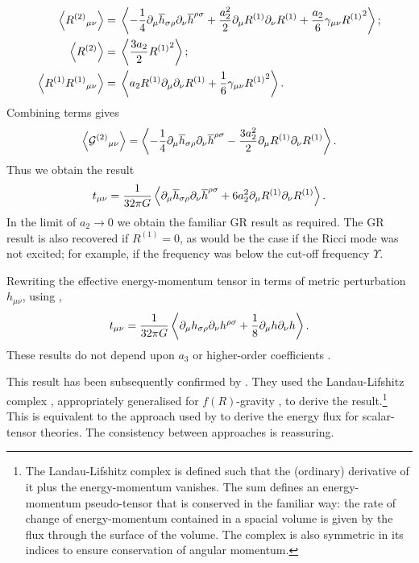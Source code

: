 \begin{subequations}
\begin{align}
\left\langle {R^{(2)}}_{\mu\nu} \right\rangle = {} & \left\langle -\frac{1}{4} \partial_\mu\overline{h}_{\sigma\rho}\partial_\nu\overline{h}^{\rho\sigma} + \frac{a_2^2}{2}\partial_\mu R^{(1)}\partial_\nu R^{(1)} + \frac{a_2}{6}\gamma_{\mu\nu} {R^{(1)}}^2 \right\rangle; \\
\left\langle R^{(2)} \right\rangle = {} & \left\langle \frac{3a_2}{2}{R^{(1)}}^2 \right\rangle; \\
\left\langle R^{(1)}{R^{(1)}}_{\mu\nu} \right\rangle = {} & \left\langle a_2 R^{(1)} \partial_\mu\partial_\nu R^{(1)} + \frac{1}{6}\gamma_{\mu\nu}{R^{(1)}}^2\right\rangle.
\end{align}
\end{subequations}
Combining terms gives
\begin{equation}
\left\langle {\mathcal{G}^{(2)}}_{\mu\nu}\right\rangle = \left\langle -\frac{1}{4} \partial_\mu\overline{h}_{\sigma\rho}\partial_\nu\overline{h}^{\rho\sigma} - \frac{3a_2^2}{2}\partial_\mu R^{(1)}\partial_\nu R^{(1)} \right\rangle.
\end{equation}
Thus we obtain the result
\begin{equation}
t_{\mu\nu} = \frac{1}{32\pi G}\left\langle \partial_\mu\overline{h}_{\sigma\rho}\partial_\nu\overline{h}^{\rho\sigma} + 6a_2^2\partial_\mu R^{(1)}\partial_\nu R^{(1)} \right\rangle.
\label{eq:Pseudotensor}
\end{equation}
In the limit of $a_2 \rightarrow 0$ we obtain the familiar GR result as required. The GR result is also recovered if $R^{(1)} = 0$, as would be the case if the Ricci mode was not excited; for example, if the frequency was below the cut-off frequency $\Upsilon$.

Rewriting the effective energy-momentum tensor in terms of metric perturbation $h_{\mu\nu}$, using ,
\begin{equation}
t_{\mu\nu} = \frac{1}{32\pi G}\left\langle \partial_\mu h_{\sigma\rho}\partial_\nu h^{\rho\sigma} + \frac{1}{8}\partial_\mu h \partial_\nu h \right\rangle.
\end{equation}
These results do not depend upon $a_3$ or higher-order coefficients \citep{Stein2011}.

This result has been subsequently confirmed by \citet{Naf2011}. They used the Landau-Lifshitz complex \citep[section 94]{Landau1975}, appropriately generalised for $f(R)$-gravity \citep{Nutku1969}, to derive the result.\footnote{The Landau-Lifshitz complex is defined such that the (ordinary) derivative of it plus the energy-momentum vanishes. The sum defines an energy-momentum pseudo-tensor that is conserved in the familiar way: the rate of change of energy-momentum contained in a spacial volume is given by the flux through the surface of the volume. The complex is also symmetric in its indices to ensure conservation of angular momentum.} This is equivalent to the approach used by \citet[section 10.3]{Will1993} to derive the energy flux for scalar-tensor theories. The consistency between approaches is reassuring.


